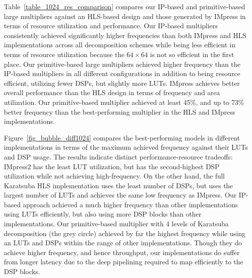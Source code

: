 \documentclass[conference]{IEEEtran}
\begin{document}
Table~\ref{table_1024_res_comparison} compares our IP-based and primitive-based large multipliers against an HLS-based design and those generated by IMpress in terms of resource utilization and performance.
Our IP-based multipliers consistently achieved significantly higher frequencies than both IMpress and HLS implementations across all decomposition schemes while being less efficient in terms of resource utilization because the $64\times64$ is not so efficient in the first place. 
Our primitive-based large multipliers achieved higher frequency than the IP-based multipliers in all different configurations in addition to being resource efficient, utilizing fewer DSPs, but slightly more LUTs.
IMpress achieves better overall performance than the HLS design in terms of frequency and area utilization.
Our primitive-based multiplier achieved at least 45\%, and up to 73\% better frequency than the best-performing multiplier in the HLS and IMpress implementations. 






Figure~\ref{fig_bubble_diff1024}  compares the best-performing models in different implementations in terms of the maximum achieved frequency against their LUTs and DSP usage.
The results indicate distinct performance-resource tradeoffs: IMpress2 has the least LUT utilization, but has the second-highest DSP utilization while not achieving high-frequency.
On the other hand, the full Karatsuba HLS implementation uses the least number of DSPs, but uses the largest number of LUTs and achieves the same low frequency as IMpress. 
Our IP-based approach achieved a much higher frequency than other implementations using LUTs efficiently, but also using more DSP blocks than other implementations.
Our primitive-based multiplier with 4 levels of Karatsuba decomposition (the grey circle) achieved by far the highest frequency while using an LUTs and DSPs within the range of other implementations.
Though they do achieve higher frequency, and hence throughput, our implementations do suffer from longer latency due to the deep pipelining required to map efficiently to the DSP blocks.
\end{document}
